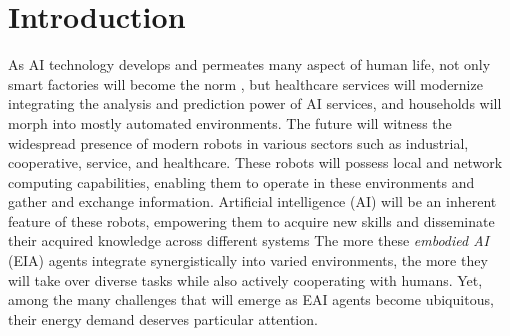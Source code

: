 \documentclass[12pt]{article}
\renewcommand{\emph}[1]{\textit{#1}}
\begin{document}

\newcommand{\beginsupplement}
{%
	\setcounter{table}{0}
	\renewcommand{\thesection}{S\arabic{section}}
	\renewcommand{\thetable}{S\arabic{table}}%
	\setcounter{figure}{0}
	\renewcommand{\thefigure}{S\arabic{figure}}%
}


\section*{Introduction}\label{sec:intro}
As AI technology develops and permeates many aspect of human life, not only smart factories will become the norm \cite{Szczepanski2019Economicimpactsartificial}, but healthcare services will modernize integrating the analysis and prediction power of AI services, and households will morph into mostly automated environments. The future will witness the widespread presence of modern robots in various sectors such as industrial, cooperative, service, and healthcare. These robots will possess local and network computing capabilities, enabling them to operate in these environments and gather and exchange information. Artificial intelligence (AI) will be an inherent feature of these robots, empowering them to acquire new skills and disseminate their acquired knowledge across different systems The more these \emph{embodied AI} (EIA) agents integrate synergistically into varied environments, the more they will take over diverse tasks while also actively cooperating with humans. Yet, among the many challenges that will emerge as EAI agents become ubiquitous, their energy demand deserves particular attention.
\end{document}
